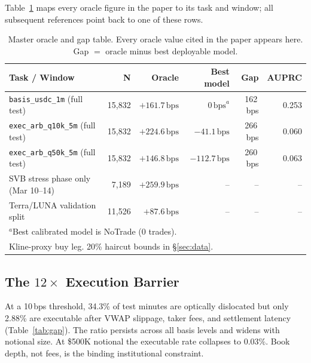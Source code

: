 \documentclass[sigconf,anonymous,natbib=false]{acmart}
\newcommand{\bps}{\,\text{bps}}
\newcommand{\task}[1]{\texttt{\small #1}}
\begin{document}
Table~\ref{tab:master} maps every oracle figure in the paper to its task and window;
all subsequent references point back to one of these rows.

\begin{table}[t]
\centering
\caption{Master oracle and gap table.
  Every oracle value cited in the paper appears here.
  Gap $=$ oracle minus best deployable model.}
\label{tab:master}
\setlength{\tabcolsep}{3pt}
{\scriptsize
\begin{tabular}{lrrrrr}
\toprule
\textbf{Task / Window} & \textbf{N} & \textbf{Oracle} & \textbf{Best model} & \textbf{Gap} & \textbf{AUPRC}\\
\midrule
\task{basis\_usdc\_1m} (full test)       & 15,832 & $+161.7\bps$ & $0\bps^a$ & 162\,bps & 0.253\\
\task{exec\_arb\_q10k\_5m} (full test)   & 15,832 & $+224.6\bps$ & $-41.1\bps$ & 266\,bps & 0.060\\
\task{exec\_arb\_q50k\_5m} (full test)   & 15,832 & $+146.8\bps$ & $-112.7\bps$ & 260\,bps & 0.063\\
\midrule
SVB stress phase only (Mar 10--14)       &  7,189 & $+259.9\bps$ & -- & -- & --\\
Terra/LUNA validation split              & 11,526 & $+87.6\bps$  & -- & -- & --\\
\bottomrule
\multicolumn{6}{l}{\footnotesize $^a$Best calibrated model is NoTrade (0 trades).}\\
\multicolumn{6}{l}{\footnotesize Kline-proxy buy leg. 20\% haircut bounds in \S\ref{sec:data}.}\\
\end{tabular}
}
\end{table}

\subsection{The $12\times$ Execution Barrier}
\label{sec:gap}

At a 10\,bps threshold, 34.3\% of test minutes are optically
dislocated but only 2.88\% are executable after VWAP slippage,
taker fees, and settlement latency (Table~\ref{tab:gap}).
The ratio persists across all basis levels and widens with notional
size. At \$500K notional the executable rate collapses to $0.03\%$. Book depth, not fees, is the binding institutional constraint.
\end{document}
